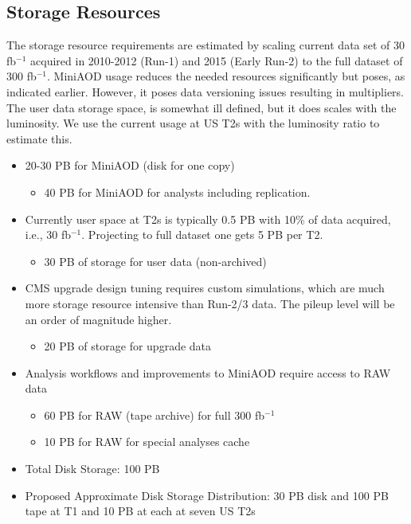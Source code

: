 \subsection{Storage Resources}

The storage resource requirements are estimated by scaling current data set 
of 30 fb$^{-1}$ acquired in 2010-2012 (Run-1) and 2015 (Early Run-2) to the
full dataset of 300 fb$^{-1}$.  MiniAOD usage reduces the needed resources
significantly but poses, as indicated earlier.  However, it poses data versioning
issues resulting in multipliers.  The user data storage space, is somewhat
ill defined, but it does scales with the luminosity. We use the current usage
at US T2s with the luminosity ratio to estimate this.  

\begin{itemize}
\item 20-30 PB for MiniAOD (disk for one copy)
\begin{itemize}
\item 40 PB for MiniAOD for analysts including replication.
\end{itemize}
\item Currently user space at T2s is typically 0.5 PB with 10\% of data acquired, i.e., 30 fb$^{-1}$.
Projecting to full dataset one gets 5 PB per T2.
\begin{itemize} 
\item 30 PB of storage for user data (non-archived)
\end{itemize}
\item CMS upgrade design tuning requires custom simulations, which are much more
storage resource intensive than Run-2/3 data.  The pileup level will be an order of
magnitude higher.
\begin{itemize} 
\item 20 PB of storage for upgrade data
\end{itemize} 
\item Analysis workflows and improvements to MiniAOD require access to RAW data
\begin{itemize}
\item 60 PB for RAW (tape archive) for full 300 fb$^{-1}$
\end{itemize} 
\begin{itemize}
\item 10 PB for RAW for special analyses cache
\end{itemize}
\item Total Disk Storage:  100 PB
\item Proposed Approximate Disk Storage Distribution: 30 PB disk and 100 PB tape at T1 and 10 PB at each at seven US T2s
\end{itemize}

